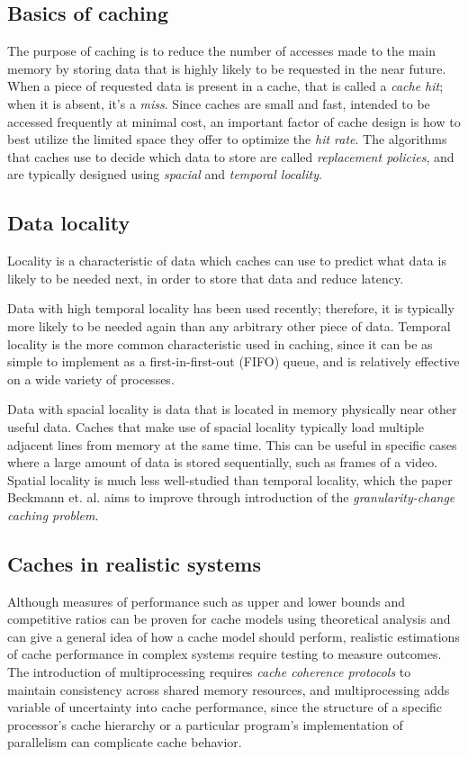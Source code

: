 \documentclass[12pt,twoside]{reedthesis}
\begin{document}
	\subsection*{Basics of caching}
	
	The purpose of caching is to reduce the number of accesses made to the main memory by storing data that is highly likely to be requested in the near future. When a piece of requested data is present in a cache, that is called a \textit{cache hit}; when it is absent, it's a \textit{miss}. Since caches are small and fast, intended to be accessed frequently at minimal cost, an important factor of cache design is how to best utilize the limited space they offer to optimize the \textit{hit rate}. The algorithms that caches use to decide which data to store are called \textit{replacement policies}, and are typically designed using \textit{spacial} and \textit{temporal locality}.

	\subsection*{Data locality}

	Locality is a characteristic of data which caches can use to predict what data is likely to be needed next, in order to store that data and reduce latency.
	
	Data with high temporal locality has been used recently; therefore, it is typically more likely to be needed again than any arbitrary other piece of data. Temporal locality is the more common characteristic used in caching, since it can be as simple to implement as a first-in-first-out (FIFO) queue, and is relatively effective on a wide variety of processes.
	
	Data with spacial locality is data that is located in memory physically near other useful data. Caches that make use of spacial locality typically load multiple adjacent lines from memory at the same time. This can be useful in specific cases where a large amount of data is stored sequentially, such as frames of a video. Spatial locality is much less well-studied than temporal locality, which the paper Beckmann et. al. aims to improve through introduction of the \textit{granularity-change caching problem}.

	\subsection*{Caches in realistic systems}

	Although measures of performance such as upper and lower bounds and competitive ratios can be proven for cache models using theoretical analysis and can give a general idea of how a cache model should perform, realistic estimations of cache performance in complex systems require testing to measure outcomes. The introduction of multiprocessing requires \textit{cache coherence protocols} to maintain consistency across shared memory resources, and multiprocessing adds variable of uncertainty into cache performance, since the structure of a specific processor's cache hierarchy or a particular program's implementation of parallelism can complicate cache behavior.
\end{document}
